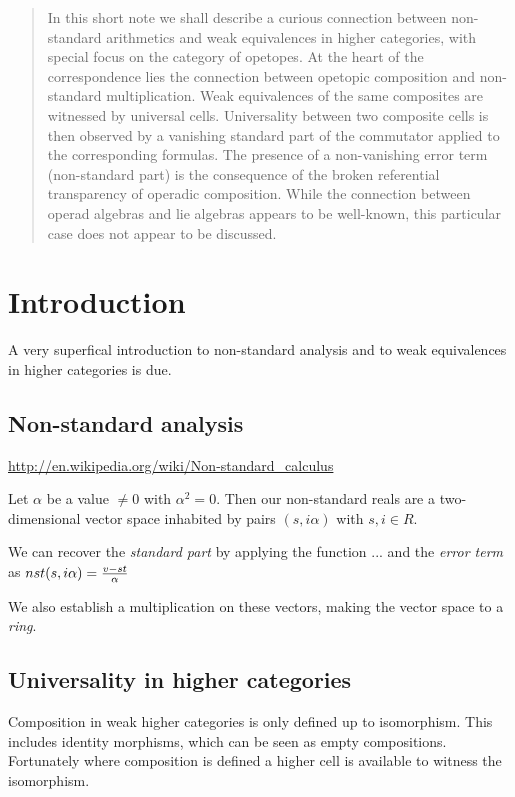 \documentclass{article}
\begin{document}
\newcommand{\compose}[3]{$#1{;_#2}#3$}
\newcommand{\nsproduct}[3]{$(#1 + #2)(#3 + #2)$}
\newcommand{\lie}[4]{$#1{_{[#3,#2]}}#4$}

\begin{abstract}
In this short note we shall describe a curious connection
between non-standard arithmetics and weak equivalences
in higher categories, with special focus on the category of
opetopes. At the heart of the correspondence lies the
connection between opetopic composition and non-standard
multiplication. Weak equivalences of the same composites are
witnessed by universal cells. Universality between two
composite cells is then observed by a vanishing standard
part of the commutator applied to the corresponding formulas.
The presence of a non-vanishing error term (non-standard part)
is the consequence of the broken referential transparency of
operadic composition.
While the connection between operad algebras and
lie algebras appears to be well-known, this particular
case does not appear to be discussed.
\end{abstract}

\section{Introduction}
A very superfical introduction to non-standard analysis
and to weak equivalences in higher categories is due.

\subsection{Non-standard analysis}

\url{http://en.wikipedia.org/wiki/Non-standard_calculus}

Let $\alpha$ be a value $\neq 0$ with $\alpha^2 = 0$. Then
our non-standard reals are a two-dimensional vector space
inhabited by pairs $(s, i \alpha)$ with $s, i \in R$.

We can recover the \emph{standard part} by applying the function
... 
and the \emph{error term} as $nst (s, i\alpha) = {v - st \over \alpha}$

We also establish a multiplication on these vectors, making
the vector space to a \emph{ring}.

\subsection{Universality in higher categories}

Composition in weak higher categories is only defined up to
isomorphism. This includes identity morphisms, which can be
seen as empty compositions. Fortunately where composition
is defined a higher cell is available to witness the isomorphism.
\end{document}
